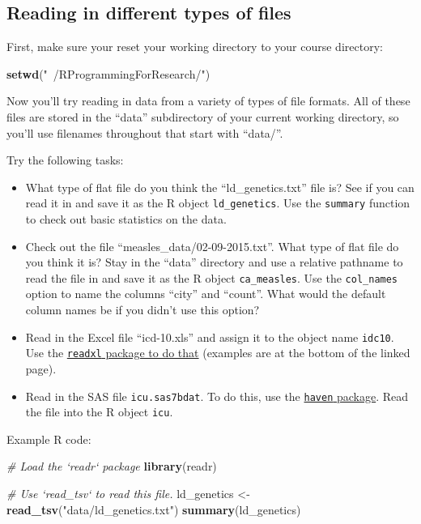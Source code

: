 \documentclass[]{book}
\makeatletter
\newenvironment{Shaded}{\begin{snugshade}}{\end{snugshade}}
\newcommand{\KeywordTok}[1]{\textcolor[rgb]{0.13,0.29,0.53}{\textbf{#1}}}
\newcommand{\StringTok}[1]{\textcolor[rgb]{0.31,0.60,0.02}{#1}}
\newcommand{\CommentTok}[1]{\textcolor[rgb]{0.56,0.35,0.01}{\textit{#1}}}
\newcommand{\NormalTok}[1]{#1}
\providecommand{\tightlist}{%
  \setlength{\itemsep}{0pt}\setlength{\parskip}{0pt}}
\newenvironment{kframe}{%
\medskip{}
\setlength{\fboxsep}{.8em}
 \def\at@end@of@kframe{}%
 \ifinner\ifhmode%
  \def\at@end@of@kframe{\end{minipage}}%
  \begin{minipage}{\columnwidth}%
 \fi\fi%
 \def\FrameCommand##1{\hskip\@totalleftmargin \hskip-\fboxsep
 \colorbox{shadecolor}{##1}\hskip-\fboxsep
     \hskip-\linewidth \hskip-\@totalleftmargin \hskip\columnwidth}%
 \MakeFramed {\advance\hsize-\width
   \@totalleftmargin\z@ \linewidth\hsize
   \@setminipage}}%
 {\par\unskip\endMakeFramed%
 \at@end@of@kframe}
\renewenvironment{Shaded}{\begin{kframe}}{\end{kframe}}
\theoremstyle{definition}
\theoremstyle{definition}
\theoremstyle{definition}
\theoremstyle{remark}
\makeatother
\begin{document}
\subsection{Reading in different types of
files}\label{reading-in-different-types-of-files}

First, make sure your reset your working directory to your course
directory:

\begin{Shaded}
\begin{Highlighting}[]
\KeywordTok{setwd}\NormalTok{(}\StringTok{"~/RProgrammingForResearch/"}\NormalTok{)}
\end{Highlighting}
\end{Shaded}

Now you'll try reading in data from a variety of types of file formats.
All of these files are stored in the ``data'' subdirectory of your
current working directory, so you'll use filenames throughout that start
with ``data/''.

Try the following tasks:

\begin{itemize}
\tightlist
\item
  What type of flat file do you think the ``ld\_genetics.txt'' file is?
  See if you can read it in and save it as the R object
  \texttt{ld\_genetics}. Use the \texttt{summary} function to check out
  basic statistics on the data.
\item
  Check out the file ``measles\_data/02-09-2015.txt''. What type of flat
  file do you think it is? Stay in the ``data'' directory and use a
  relative pathname to read the file in and save it as the R object
  \texttt{ca\_measles}. Use the \texttt{col\_names} option to name the
  columns ``city'' and ``count''. What would the default column names be
  if you didn't use this option?
\item
  Read in the Excel file ``icd-10.xls'' and assign it to the object name
  \texttt{idc10}. Use the
  \href{https://github.com/hadley/readxl}{\texttt{readxl} package to do
  that} (examples are at the bottom of the linked page).
\item
  Read in the SAS file \texttt{icu.sas7bdat}. To do this, use the
  \href{https://github.com/hadley/haven}{\texttt{haven} package}. Read
  the file into the R object \texttt{icu}.
\end{itemize}

Example R code:

\begin{Shaded}
\begin{Highlighting}[]
\CommentTok{# Load the `readr` package}
\KeywordTok{library}\NormalTok{(readr)}

\CommentTok{# Use `read_tsv` to read this file. }
\NormalTok{ld_genetics <-}\StringTok{ }\KeywordTok{read_tsv}\NormalTok{(}\StringTok{"data/ld_genetics.txt"}\NormalTok{)}
\KeywordTok{summary}\NormalTok{(ld_genetics)}
\end{Highlighting}
\end{Shaded}
\end{document}
